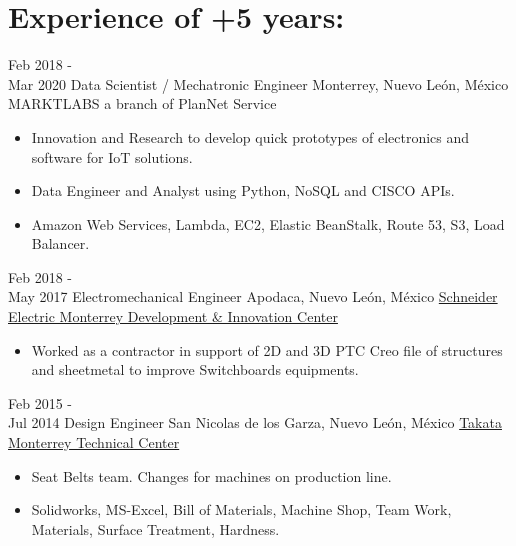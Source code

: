 \documentclass[a4paper]{twentysecondcv} %
\begin{document}
\section{Experience of +5 years:}


\begin{twenty} %

\twentyitem
        {Feb 2018 - \\Mar 2020}
        {Data Scientist / Mechatronic Engineer}
        {Monterrey, Nuevo Le\'on, M\'exico}
        {{MARKTLABS a branch of PlanNet Service}}
        {
        {
        \begin{itemize}
        \item Innovation and Research to develop quick prototypes of electronics and software for IoT solutions.
        \item Data Engineer and Analyst using Python, NoSQL and CISCO APIs.
        \item Amazon Web Services, Lambda, EC2, Elastic BeanStalk, Route 53, S3, Load Balancer.
        \end{itemize}
        }
        }

\twentyitem
        {Feb 2018 - \\May 2017}
        {Electromechanical Engineer}
        {Apodaca, Nuevo Le\'on, M\'exico}
        {\href{http://www.schneider-electric.com.mx}{Schneider Electric Monterrey Development \& Innovation Center}}
         {
        {
        \begin{itemize}
        \item Worked as a contractor in support of 2D and 3D PTC Creo file of structures and sheetmetal to improve Switchboards equipments.
        \end{itemize}
        }
        }
        
	\twentyitem
    	{Feb 2015 - \\Jul 2014}
        {Design Engineer}
        {San Nicolas de los Garza, Nuevo Le\'on, M\'exico}
        {\href{https://en.wikipedia.org/wiki/Takata_Corporation}{Takata Monterrey Technical Center}}
        {
        {\begin{itemize}
        \item Seat Belts team. Changes for machines on production line.
        \item Solidworks, MS-Excel, Bill of Materials, Machine Shop, Team Work, Materials, Surface Treatment, Hardness.
    \end{itemize}}
        }
        

\end{twenty}
\end{document}
